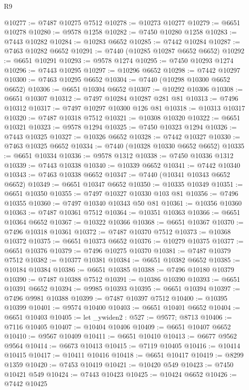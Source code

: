 \begin{lexlean}{R9}
\begin{coremodule}
{{{{{{{{{{{{{{{{{{{{{{{{{{{{{{{{{{{{{{{{{{{{{{{{{{{{{{{{{{{{{{{{{{{{{{{{{{{{{{{{{{{{@10277 := @7487 @10275 @7512
@10278 := @10273 @10277
@10279 := @6651 @10278
@10280 := @9578 @1258
@10282 := @7450 @10280 @1258
@10283 := @7443 @10282
@10284 := @10283 @6652
@10285 := @7442 @10284
@10287 := @7463 @10282 @6652
@10291 := @7440 (@10285 @10287 @6652 @6652)
@10292 := @6651 @10291
@10293 := @9578 @1274
@10295 := @7450 @10293 @1274
@10296 := @7443 @10295
@10297 := @10296 @6652
@10298 := @7442 @10297
@10300 := @7463 @10295 @6652
@10304 := @7440 (@10298 @10300 @6652 @6652)
@10306 := @6651 @10304 @6652
@10307 := @10292 @10306
@10308 := @6651 @10307
@10312 := @7497 @10284 @10287 @281 @81
@10313 := @7496 @10312
@10317 := @7497 @10297 @10300 @126 @81
@10318 := @10313 @10317
@10320 := @7487 @10318 @7512
@10321 := @10308 @10320
@10322 := @6651 @10321
@10323 := @9578 @1294
@10325 := @7450 @10323 @1294
@10326 := @7443 @10325
@10327 := @10326 @6652
@10328 := @7442 @10327
@10330 := @7463 @10325 @6652
@10334 := @7440 (@10328 @10330 @6652 @6652)
@10335 := @6651 @10334
@10336 := @9578 @1312
@10338 := @7450 @10336 @1312
@10339 := @7443 @10338
@10340 := @10339 @6652
@10341 := @7442 @10340
@10343 := @7463 @10338 @6652
@10347 := @7440 (@10341 @10343 @6652 @6652)
@10349 := @6651 @10347 @6652
@10350 := @10335 @10349
@10351 := @6651 @10350
@10355 := @7497 @10327 @10330 @103 @81
@10356 := @7496 @10355
@10360 := @7497 @10340 @10343 @50 @81
@10361 := @10356 @10360
@10363 := @7487 @10361 @7512
@10364 := @10351 @10363
@10366 := @6651 @10364 @6652
@10367 := @10322 @10366
@10368 := @6651 @10367
@10370 := @7496 @10318 @10361
@10372 := @7487 @10370 @7512
@10373 := @10368 @10372
@10375 := @6651 @10373 @6652
@10376 := @10279 @10375
@10377 := @6651 @10376
@10379 := @7496 @10275 @10370
@10381 := @7487 @10379 @7512
@10382 := @10377 @10381
@10384 := @6651 @10382 @6652
@10385 := @10184 @10384
@10386 := @6651 @10385
@10388 := @7496 @10180 @10379
@10390 := @7487 @10388 @7512
@10391 := @10386 @10390
@10393 := @6651 @10391 @6652
@10394 := @9985 @10393
@10395 := @6651 @10394
@10397 := @7496 @9981 @10388
@10399 := @7487 @10397 @7512
@10400 := @10395 @10399
@10401 := @9574 @10400
@10403 := @6651 @10401 @6652
@10404 := @6651 @10403
@10405 := let _ywiden2 : @527 := @9577; @8713
@10406 := @7116 @10405
@10407 := @10404 @10406
@10409 := @6651 @10407 @6652
@10410 := @9567 @10409
@10411 := @6651 @10410
@10413 := @6677 @9562 @9564
@10414 := @6673 @10413
@10415 := @7119 @10405
@10416 := @10414 @10415
@10417 := @10411 @10416
@10418 := @6651 @10417
@10419 := @8299 @1359
@10420 := @7453 @10419
@10421 := @10420 @549
@10423 := @7450 @10421 @549
@10424 := @7443 @10423
@10425 := @10424 @6652
@10426 := @7442 @10425
}}}}}}}}}}}}}}}}}}}}}}}}}}}}}}}}}}}}}}}}}}}}}}}}}}}}}}}}}}}}}}}}}}}}}}}}}}}}}}}}}}}}
\end{coremodule}
\end{lexlean}
